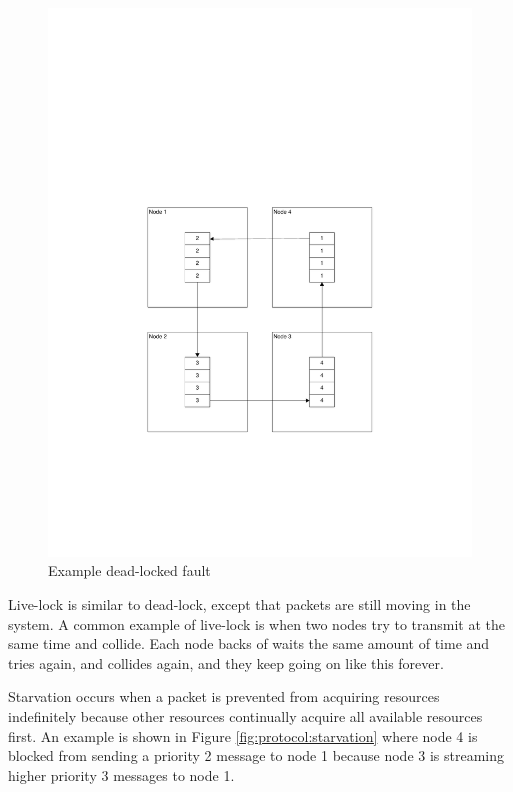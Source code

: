 \begin{figure}[ptb]
	\begin{centering}
		\includegraphics[scale=0.75]{Protocol/Figures/protocol-dead_lock.pdf}
		\caption{Example dead-locked fault}
		\label{fig:protocol:dead_lock}
	\end{centering}
\end{figure}

Live-lock is similar to dead-lock, except that packets are still moving in the system. A common example of live-lock is when two nodes try to transmit at the same time and collide. Each node backs of waits the same amount of time and tries again, and collides again, and they keep going on like this forever.

Starvation occurs when a packet is prevented from acquiring resources indefinitely because other resources continually acquire all available resources first. An example is shown in Figure \ref{fig:protocol:starvation} where node 4 is blocked from sending a priority 2 message to node 1 because node 3 is streaming higher priority 3 messages to node 1.

